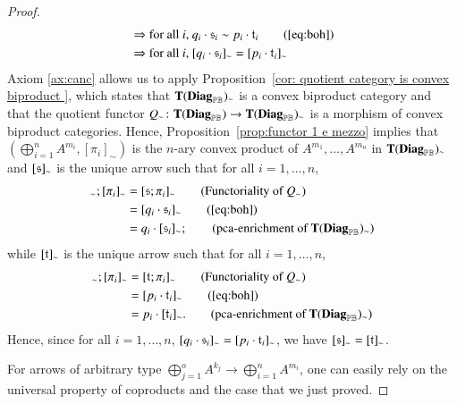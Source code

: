 \begin{proof}
\begin{align*}
& \Rightarrow  \text{for all }i\text{, }  q_i \cdot \s_i\sim p_i \cdot \t_i \tag{\ref{eq:boh}}\\
& \Rightarrow  \text{for all }i\text{, }  [q_i \cdot \s_i]_\sim = [p_i \cdot \t_i]_\sim 
\end{align*}
Axiom \ref{ax:canc} allows us to apply Proposition~\ref{cor: quotient category is convex biproduct }, which states that $\mathbf{T}(\mathbf{Diag}_{\mathbb{PB}})_\sim$ is a convex biproduct category and that the quotient functor $Q_\sim\colon \mathbf{T}(\mathbf{Diag}_{\mathbb{PB}}) \to \mathbf{T}(\mathbf{Diag}_{\mathbb{PB}})_\sim$ is a morphism of convex biproduct categories.  Hence, Proposition~\ref{prop:functor 1 e mezzo} implies that $(\bigoplus_{i=1}^nA^{m_i}, [\pi_i]_\sim)$ is the $n$-ary convex product of $A^{m_1}, \dots, A^{m_n}$ in $\mathbf{T}(\mathbf{Diag}_{\mathbb{PB}})_\sim$ and $ [\mathfrak{s}]_\sim$ is the unique arrow such that for all $i=1,\dots,n$,
\begin{align}
  [\s]_\sim;[\pi_i]_\sim &= [\s;\pi_i]_\sim \tag{Functoriality of $Q_\eqsyn$}\\
   &=[q_i \cdot \s_i]_\sim \tag{\ref{eq:boh}}\\
  &=q_i\cdot [\s_i]_\sim; \tag{pca-enrichment of $\CatT{\Diag{\ThPB}}_\sim$}
\end{align}
while $[\mathfrak{t}]_\sim$ is the unique arrow such that for all $i=1,\dots,n$,
\begin{align}
  [\t]_\sim;[\pi_i]_\sim&= [\t;\pi_i]_\sim \tag{Functoriality of $Q_\eqsyn$}\\
  &= [p_i \cdot \t_i]_\sim \tag{\ref{eq:boh}}\\
  &=p_i\cdot [\t_i]_\sim. \tag{pca-enrichment of $\CatT{\Diag{\ThPB}}_\sim$}
\end{align}
Hence, since for all $i=1,\dots,n$, $[q_i \cdot \mathfrak{s}_i]_\sim = [p_i \cdot \mathfrak{t}_i]_\sim$, we have $[\mathfrak{s}]_\sim = [\mathfrak{t}]_\sim$.


For arrows of arbitrary type $\bigoplus_{j=1}^o A^{k_j} \to \bigoplus_{i=1}^nA^{m_i}$, one can easily rely on the universal property of coproducts and the case that we just proved.
\end{proof}

